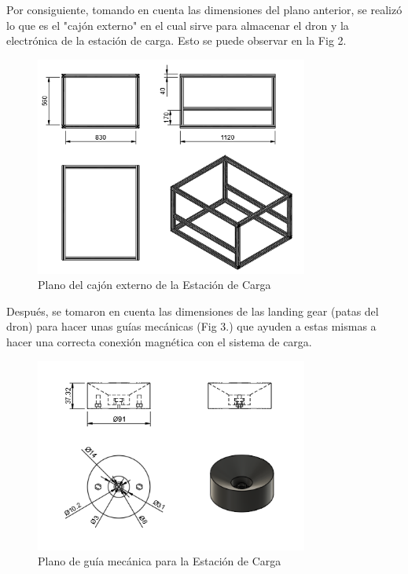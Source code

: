     Por consiguiente, tomando en cuenta las dimensiones del plano anterior, se realizó lo que es el "cajón externo" en el cual sirve para almacenar el dron y la electrónica de la estación de carga. Esto se puede observar en la Fig 2.
            \begin{figure}[htpb]
                \centering
                \includegraphics[width=0.8\textwidth]{pictures/PLANOS_CAJON_EXTERNO_1.png}
                \caption{Plano del cajón externo de la Estación de Carga}
                \label{fig:etiqueta}
            \end{figure}

    Después, se tomaron en cuenta las dimensiones de las landing gear (patas del dron) para hacer unas guías mecánicas (Fig 3.) que ayuden a estas mismas a hacer una correcta conexión magnética con el sistema de carga.
            \begin{figure}[htpb]
                \centering
                \includegraphics[width=0.8\textwidth]{pictures/PLANO_GUIAS_MECANICAS.png}
                \caption{Plano de guía mecánica para la Estación de Carga}
                \label{fig:etiqueta}
            \end{figure}


